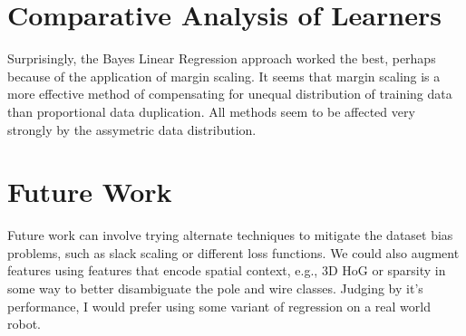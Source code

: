 \documentclass[10pt,a4paper]{article}
\begin{document}
\section{Comparative Analysis of Learners}
Surprisingly, the Bayes Linear Regression approach worked the best, perhaps because of the application of margin scaling. It seems that margin scaling is a more effective method of compensating for unequal distribution of training data than proportional data duplication. All methods seem to be affected very strongly by the assymetric data distribution.

\section{Future Work}
Future work can involve trying alternate techniques to mitigate the dataset bias problems, such as slack scaling or different loss functions. We could also augment features using features that encode spatial context, e.g., 3D HoG or sparsity in some way to better disambiguate the pole and wire classes. Judging by it's performance, I would prefer using some variant of regression on a real world robot.
\end{document}
